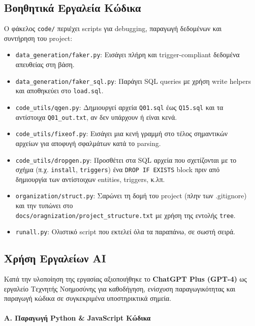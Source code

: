 \documentclass[13pt]{extarticle}
\begin{document}
\subsection{Βοηθητικά Εργαλεία Κώδικα}

Ο φάκελος \texttt{code/} περιέχει scripts για debugging, παραγωγή δεδομένων και συντήρηση του project:
\begin{itemize}
    \item \texttt{data\_generation/faker.py}: Εισάγει πλήρη και trigger-compliant δεδομένα απευθείας στη βάση.
    \item \texttt{data\_generation/faker\_sql.py}: Παράγει SQL queries με χρήση write helpers και αποθηκεύει στο \texttt{load.sql}.
    \item \texttt{code\_utils/qgen.py}: Δημιουργεί αρχεία \texttt{Q01.sql} έως \texttt{Q15.sql} και τα αντίστοιχα \texttt{Q01\_out.txt}, αν δεν υπάρχουν ή είναι κενά.
    \item \texttt{code\_utils/fixeof.py}: Εισάγει μια κενή γραμμή στο τέλος σημαντικών αρχείων για αποφυγή σφαλμάτων κατά το parsing.
    \item \texttt{code\_utils/dropgen.py}: Προσθέτει στα SQL αρχεία που σχετίζονται με το σχήμα (π.χ. \texttt{install}, \texttt{triggers}) ένα \texttt{DROP IF EXISTS} block πριν από δημιουργία των αντίστοιχων entities, triggers, κ.λπ.
    \item \texttt{organization/struct.py}: Σαρώνει τη δομή του project (πλην των .gitignore) και την τυπώνει στο \\ \texttt{docs/oragnization/project\_structure.txt} με χρήση της εντολής \texttt{tree}.
    \item \texttt{runall.py}: Ολιστικό script που εκτελεί όλα τα παραπάνω, σε σωστή σειρά.
\end{itemize}

\subsection{Χρήση Εργαλείων AI}

Κατά την υλοποίηση της εργασίας αξιοποιήθηκε το \textbf{ChatGPT Plus (GPT-4)} ως εργαλείο Τεχνητής Νοημοσύνης για καθοδήγηση, ενίσχυση παραγωγικότητας και παραγωγή κώδικα σε συγκεκριμένα υποστηρικτικά σημεία.

\paragraph*{Α. Παραγωγή Python \& JavaScript Κώδικα}~\\
\end{document}
